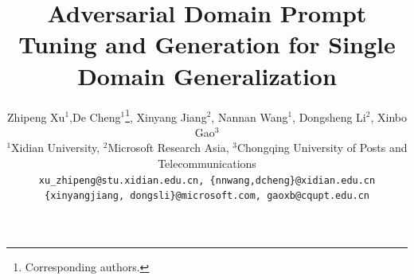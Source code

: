 \documentclass[10pt,twocolumn,letterpaper]{article}
\title{Adversarial Domain Prompt Tuning and Generation for Single Domain Generalization}
\author{Zhipeng Xu$^{1}$,De Cheng$^{1}$\thanks{Corresponding authors.}, Xinyang Jiang$^2$, Nannan Wang$^{1}$, Dongsheng Li$^2$, Xinbo Gao$^3$\\ 
{$^{1}$}Xidian University, 
{$^{2}$}Microsoft Research Asia, 
{$^{3}$}Chongqing University of Posts and Telecommunications\\
{\tt \small xu\_zhipeng@stu.xidian.edu.cn,  \{nnwang,dcheng\}@xidian.edu.cn}\\
{\tt \small \{xinyangjiang, dongsli\}@microsoft.com, gaoxb@cqupt.edu.cn}}
\begin{document}
\maketitle

    



{
    \small
    
    
}

% 
\end{document}
